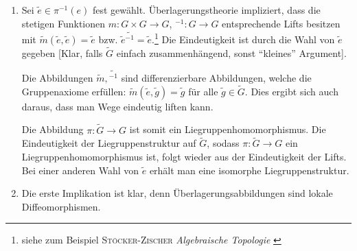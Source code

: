 \begin{beweis}
    \begin{enumerate}[(1)]
        \item Sei $\widetilde{e} \in \pi^{-1}(e)$ fest gewählt.
        Überlagerungstheorie impliziert, dass die stetigen Funktionen $m \colon G \times G \to G$, $^{-1} \colon G \to G$ entsprechende Lifts besitzen mit $\widetilde{m}(\widetilde{e},\widetilde{e})=\widetilde{e}$ bzw. $\widetilde{e}\widetilde{{}^{-1}} = \widetilde{e}$.\footnote{siehe zum Beispiel \textsc{Stöcker-Zischer} \emph{Algebraische Topologie} \cite[Abschnitt 6.2]{stockerAlgTop}}
        Die Eindeutigkeit ist durch die Wahl von $\widetilde{e}$ gegeben [Klar, falls $\widetilde{G}$ einfach zusammenhängend, sonst \enquote{kleines} Argument].
        
        Die Abbildungen $\widetilde{m},\widetilde{{ }^{-1}}$ sind differenzierbare Abbildungen, welche die Gruppenaxiome erfüllen: $\widetilde{m} (\widetilde{e}, \widetilde{g}) = \widetilde{g}$ für alle $\widetilde{g} \in \widetilde{G}$.
        Dies ergibt sich auch daraus, dass man Wege eindeutig liften kann.
        
        Die Abbildung $\pi \colon \widetilde{G} \to G$ ist somit ein Liegruppenhomomorphismus.
        Die Eindeutigkeit der Liegruppenstruktur auf $\widetilde{G}$, sodass $\pi \colon \widetilde{G} \to G$ ein Liegruppenhomomorphismus ist, folgt wieder aus der Eindeutigkeit der Lifts.
		Bei einer anderen Wahl von $\widetilde{e}$ erhält man eine isomorphe Liegruppenstruktur.
        \item Die erste Implikation ist klar, denn Überlagerungsabbildungen sind lokale Diffeomorphismen.
        

\end{enumerate}
\end{beweis}
